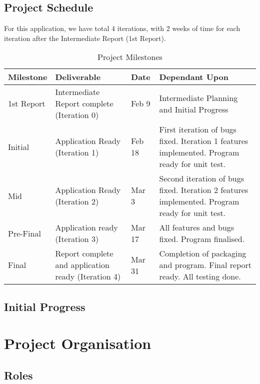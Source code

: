 \documentclass[11pt]{article}
\begin{document}
\subsection{Project Schedule}
 For this application, we have total 4 iterations, with 2 weeks of time for each iteration after the Intermediate Report (1st Report). 
 	\begin{table}[ht]
		\caption{Project Milestones} %
		\centering %
		\begin{tabular}{p{2cm}|p{4cm}|p{2cm}|p{4cm}} %
		\hline\hline %
		Milestone & Deliverable & Date & Dependant Upon \\ [0.5ex] %
		\hline
		
		1st Report & Intermediate Report complete (Iteration 0) & Feb 9 & Intermediate Planning and Initial Progress\\
		
		Initial & Application Ready (Iteration 1) & Feb 18 & First iteration of bugs fixed. Iteration 1 features implemented. Program ready for unit test.  \\ 
		
		Mid & Application Ready (Iteration 2) & Mar 3 &  Second iteration of bugs fixed. Iteration 2 features implemented. Program ready for unit test.\\
		
		Pre-Final & Application ready (Iteration 3) & Mar 17 & All features and bugs fixed. Program finalised. \\
		
		Final & Report complete and application ready (Iteration 4)  & Mar 31 & Completion of packaging and program. Final report ready. All testing done. \\[1ex] %
		\hline
		\end{tabular}
		\label{table:milestones} %
	\end{table}

\subsection{Initial Progress}


\section{Project Organisation}
\subsection{Roles}
\end{document}

